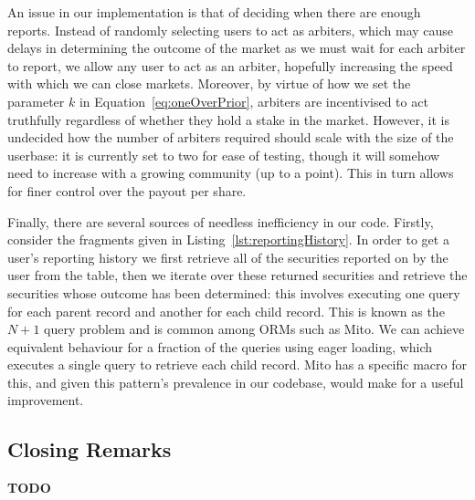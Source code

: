 An issue in our implementation is that of deciding when there are enough
reports. Instead of randomly selecting users to act as arbiters, which may
cause delays in determining the outcome of the market as we must wait for each
arbiter to report, we allow any user to act as an arbiter, hopefully increasing
the speed with which we can close markets. Moreover, by virtue of how we set
the parameter $k$ in Equation~\ref{eq:oneOverPrior}, arbiters are incentivised
to act truthfully regardless of whether they hold a stake in the market.
However, it is undecided how the number of arbiters required should
scale with the size of the userbase: it is currently set to two for ease of
testing, though it will somehow need to increase with a growing community (up
to a point). This in turn allows for finer control over the payout per share.

Finally, there are several sources of needless inefficiency in our code.
Firstly, consider the fragments given in Listing~\ref{lst:reportingHistory}.
In order to get a user's reporting history we first retrieve all of the
securities reported on by the user from the  table, then we
iterate over these returned securities and retrieve the securities whose
outcome has been determined: this involves executing one query for each parent
record and another for each child record. This is known as the $N+1$ query
problem and is common among ORMs such as Mito. We can achieve equivalent
behaviour for a fraction of the queries using eager loading, which executes a
single query to retrieve each child record. Mito has a specific macro for this,
and given this pattern's prevalence in our codebase, would make for a useful
improvement.

\subsection{Closing Remarks}

\textbf{TODO}
